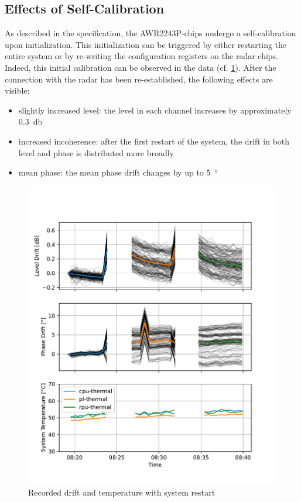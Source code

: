 \subsection{Effects of Self-Calibration}
As described in the specification, the AWR2243P-chips undergo a self-calibration upon initialization.
This initialization can be triggered by either restarting the entire system or by re-writing the configuration registers on the radar chips.
Indeed, this initial calibration can be observed in the data (cf. \ref{fig:restart}).
After the connection with the radar has been re-established, the following effects are visible:
\begin{itemize}
    \item slightly increased level: the level in each channel increases by approximately \SI{0.3}{\decibel}
    \item increased incoherence: after the first restart of the system, the drift in both level and phase is distributed more broadly
    \item mean phase: the mean phase drift changes by up to \SI{5}{\degree}
\end{itemize}

\begin{figure}
    \centering
    \includegraphics[width=\textwidth]{../figures/meas_23-10-30_reboots_phase_drift.pdf}
    \caption{Recorded drift and temperature with system restart}
    \label{fig:restart}
\end{figure}

